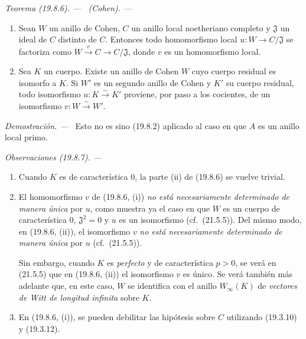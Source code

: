 \documentclass[10pt,oneside]{book}
\makeatletter
\newcommand{\setmanualcurrentlabel}[1]{\def\@currentlabel{#1}}
\newenvironment{theorem}[1][]{%
  \setmanualcurrentlabel{#1}\par\medskip\noindent\itshape Teorema (#1). ---\ }{\par}
\newenvironment{remarks}[1][]{%
  \setmanualcurrentlabel{#1}\par\medskip\noindent\itshape Observaciones (#1). ---\ }{\par}
\newenvironment{proof}{%
  \par\medskip\noindent\textit{Demostración. ---\ }}{\par}
\makeatother
\begin{document}
\begin{theorem}[19.8.6]
\label{0.19.8.6-es}
\textup{(Cohen).} ---
\begin{enumerate}
  \item[\textup{(i)}] Sean $W$ un anillo de Cohen, $C$ un anillo local noetheriano
  completo y $\mathfrak J$ un ideal de $C$ distinto de $C$. Entonces todo
  homomorfismo local $u:W\to C/\mathfrak J$ se factoriza como
  $W\xrightarrow{v}C\to C/\mathfrak J$, donde $v$ es un homomorfismo local.
  \item[\textup{(ii)}] Sea $K$ un cuerpo. Existe un anillo de Cohen $W$ cuyo cuerpo
  residual es isomorfo a $K$. Si $W'$ es un segundo anillo de Cohen y $K'$ su
  cuerpo residual, todo isomorfismo $u:K\xrightarrow{\sim}K'$ proviene, por
  paso a los cocientes, de un isomorfismo $v:W\xrightarrow{\sim}W'$.
\end{enumerate}
\end{theorem}

\begin{proof}
Esto no es sino (19.8.2) aplicado al caso en que $A$ es un anillo local primo.
\end{proof}

\begin{remarks}[19.8.7]
\label{0.19.8.7-es}
\begin{enumerate}
  \item[(i)] Cuando $K$ es de característica $0$, la parte (ii) de (19.8.6)
  se vuelve trivial.
  \item[(ii)] El homomorfismo $v$ de (19.8.6, (i)) \emph{no está
  necesariamente determinado de manera única} por $u$, como muestra ya el
  caso en que $W$ es un cuerpo de característica $0$, $\mathfrak J^2=0$ y $u$
  es un isomorfismo (cf.~(21.5.5)). Del mismo modo, en (19.8.6, (ii)), el
  isomorfismo $v$ \emph{no está necesariamente determinado de manera única}
  por $u$ (cf.~(21.5.5)).

  Sin embargo, cuando $K$ es \emph{perfecto} y de característica $p>0$, se
  verá en (21.5.5) que en (19.8.6, (ii)) el isomorfismo $v$ es único. Se verá
  también más adelante que, en este caso, $W$ se identifica con el anillo
  $W_\infty(K)$ de \emph{vectores de Witt de longitud infinita} sobre $K$.
  \item[(iii)] En (19.8.6, (i)), se pueden debilitar las hipótesis sobre $C$
  utilizando (19.3.10) y (19.3.12).
\end{enumerate}
\end{remarks}
\end{document}
